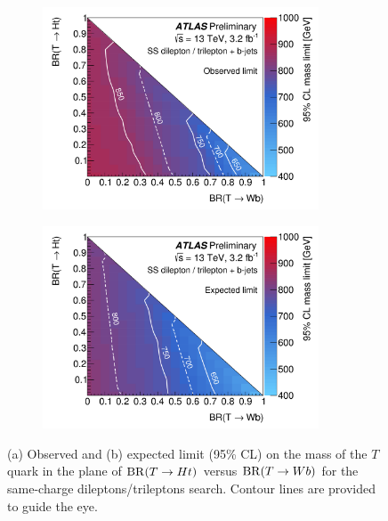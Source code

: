 \begin{figure}[h!]
\begin{subfigure}{0.5\textwidth}
  \centering
  \includegraphics[width=0.9\textwidth]{figures/VLQ/ssb.png}
  \caption{}
  \label{}
\end{subfigure}
\begin{subfigure}{0.5\textwidth}
  \centering
  \includegraphics[width=0.9\textwidth]{figures/VLQ/ssa.png}
  \caption{}
  \label{}
\end{subfigure}
\captionsetup{width=0.85\textwidth} \caption{\small (a) Observed and (b) expected limit (95\% CL) on the mass of the $T$ quark in the plane 
of ${\rm BR}(T \to Ht)$ versus ${\rm BR}(T \to Wb)$ for the same-charge dileptons/trileptons search. 
Contour lines are provided to guide the eye.}
\label{sec:vlq:fig:SS}
\end{figure}
